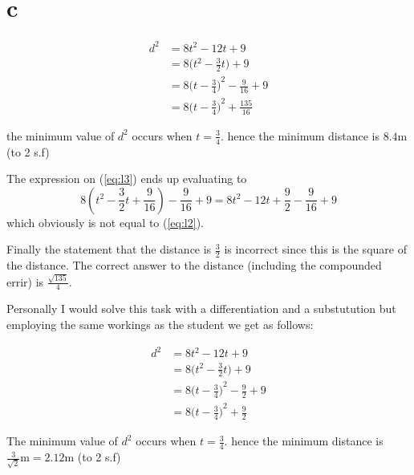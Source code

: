 \documentclass{article}
\begin{document}
\section{c}

\begin{align}
	d^2 & = 8 t^2 - 12 t + 9                       \label{eq:l1}         \\
	    & = 8\Big(t^2 - \frac 32 t\Big) + 9                \label{eq:l2} \\
	    & = 8{\Big(t - \frac 34\Big)}^2 - \frac 9 {16} + 9 \label{eq:l3} \\
	    & = 8{\Big(t - \frac 34\Big)}^2 + \frac {135} {16} \label{eq:l4}
\end{align}
\begin{center}
	\parbox{7cm}{
		the minimum value of $d^2$ occurs when $t =\frac 34$.
		hence the minimum distance is $8.4 \mathrm m$ (to 2 s.f)}
\end{center}

The expression on (\ref{eq:l3}) ends up evaluating to
$$8(t^2 - \frac 32 t + \frac 9 {16}) - \frac 9{16} + 9 = 8t^2 - 12 t + \frac 9 {2} - \frac 9{16} + 9$$
which obviously is not equal to (\ref{eq:l2}).

Finally the statement that the distance is $\frac 32$ is incorrect since this is the square of the distance. The correct answer to the distance (including the compounded errir) is $\frac {\sqrt{135}}4$.


Personally I would solve this task with a differentiation and a substutution but employing the same workings as the student we get as follows:

\begin{align}
	d^2 & = 8 t^2 - 12 t + 9                       \label{eq:2l1}         \\
	    & = 8\Big(t^2 - \frac 32 t\Big) + 9                \label{eq:2l2} \\
	    & = 8{\Big(t - \frac 34\Big)}^2 - \frac 92 + 9 \label{eq:2l3}     \\
	    & = 8{\Big(t - \frac 34\Big)}^2 + \frac 92 \label{eq:2l4}
\end{align}

\begin{center}
	\parbox{7cm}{
		The minimum value of $d^2$ occurs when $t =\frac 34$.
		hence the minimum distance is $\frac 3{\sqrt 2} \mathrm m = 2.12\mathrm m $ (to 2 s.f)}
\end{center}
\end{document}
